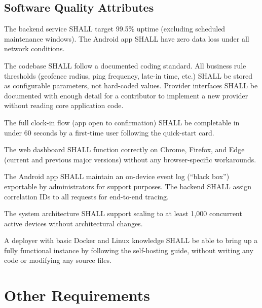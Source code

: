 \documentclass[12pt, a4paper]{article}
\begin{document}
\subsection{Software Quality Attributes}

\begin{description}[leftmargin=3cm, style=nextline]
    \item[Reliability]
        The backend service SHALL target 99.5\% uptime (excluding
        scheduled maintenance windows). The Android app SHALL have zero
        data loss under all network conditions.
    \item[Maintainability]
        The codebase SHALL follow a documented coding standard. All
        business rule thresholds (geofence radius, ping frequency,
        late-in time, etc.) SHALL be stored as configurable parameters,
        not hard-coded values. Provider interfaces SHALL be documented
        with enough detail for a contributor to implement a new provider
        without reading core application code.
    \item[Usability]
        The full clock-in flow (app open to confirmation) SHALL be
        completable in under 60 seconds by a first-time user following
        the quick-start card.
    \item[Portability]
        The web dashboard SHALL function correctly on Chrome, Firefox,
        and Edge (current and previous major versions) without any
        browser-specific workarounds.
    \item[Debuggability]
        The Android app SHALL maintain an on-device event log (``black
        box'') exportable by administrators for support purposes. The
        backend SHALL assign correlation IDs to all requests for
        end-to-end tracing.
    \item[Scalability]
        The system architecture SHALL support scaling to at least 1,000
        concurrent active devices without architectural changes.
    \item[Self-Hostability]
        A deployer with basic Docker and Linux knowledge SHALL be able
        to bring up a fully functional instance by following the
        self-hosting guide, without writing any code or modifying any
        source files.
\end{description}

\section{Other Requirements}
\end{document}
